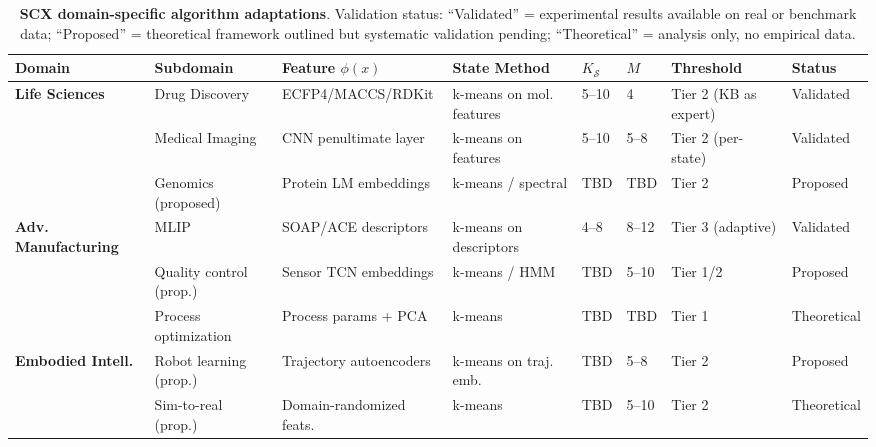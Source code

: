 \documentclass{article}
\begin{document}
\begin{table}[ht]
\caption{\textbf{SCX domain-specific algorithm adaptations}. Validation status: ``Validated'' = experimental results available on real or benchmark data; ``Proposed'' = theoretical framework outlined but systematic validation pending; ``Theoretical'' = analysis only, no empirical data.}
\label{tab:adaptations}
\centering
\small
\begin{tabular}{llllllll}
\toprule
\textbf{Domain} & \textbf{Subdomain} & \textbf{Feature $\phi(x)$} & \textbf{State Method} & $K_{\mathcal{S}}$ & $M$ & \textbf{Threshold} & \textbf{Status} \\
\midrule
\textbf{Life Sciences} & Drug Discovery & ECFP4/MACCS/RDKit & k-means on mol. features & 5--10 & 4 & Tier 2 (KB as expert) & Validated \\
 & Medical Imaging & CNN penultimate layer & k-means on features & 5--10 & 5--8 & Tier 2 (per-state) & Validated \\
 & Genomics (proposed) & Protein LM embeddings & k-means / spectral & TBD & TBD & Tier 2 & Proposed \\
\midrule
\textbf{Adv. Manufacturing} & MLIP & SOAP/ACE descriptors & k-means on descriptors & 4--8 & 8--12 & Tier 3 (adaptive) & Validated \\
 & Quality control (prop.) & Sensor TCN embeddings & k-means / HMM & TBD & 5--10 & Tier 1/2 & Proposed \\
 & Process optimization & Process params + PCA & k-means & TBD & TBD & Tier 1 & Theoretical \\
\midrule
\textbf{Embodied Intell.} & Robot learning (prop.) & Trajectory autoencoders & k-means on traj. emb. & TBD & 5--8 & Tier 2 & Proposed \\
 & Sim-to-real (prop.) & Domain-randomized feats. & k-means & TBD & 5--10 & Tier 2 & Theoretical \\
\bottomrule
\end{tabular}
\end{table}
\end{document}
